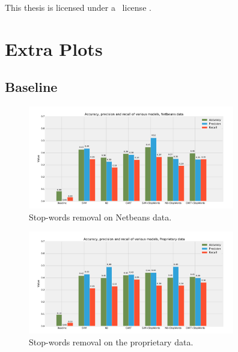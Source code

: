\documentclass[nopalatino,nolot,nolof,color]{fithesis3}
\begin{document}
 \makeatletter
  \thesis@blocks@cover
  \thesis@blocks@titlePage
  \thesis@blocks@frontMatter
  \begin{center}
    \begin{minipage}{\textwidth}
      This thesis is licensed under a \doclicenseLongNameRef~license \doclicenseIcon.%
    \end{minipage}
  \end{center}
  \thesis@blocks@assignment
  \thesis@blocks@declaration
  \thesis@blocks@thanks
  \thesis@blocks@clearRight
  \thesis@blocks@abstract
  \thesis@blocks@keywords
  \thesis@blocks@tables
  \thesis@blocks@mainMatter
 \makeatother

 
 
 
 
 
 
 

 
 

 \appendix
 \chapter{Extra Plots}
 \label{appendix:extra-plots}

 \section{Baseline}

 \begin{figure}[htbp]
    \centering
        \includegraphics[width=340px]{./images/comparison_of_models/netbeans_0.pdf}
    \caption{Stop-words removal on Netbeans data.}
    \label{fig:baseline.netbeans}
 \end{figure}

 \begin{figure}[htbp]
    \centering
        \includegraphics[width=340px]{./images/comparison_of_models/proprietary_0.pdf}
    \caption{Stop-words removal on the proprietary data.}
    \label{fig:baseline.prop}
 \end{figure}
\end{document}
